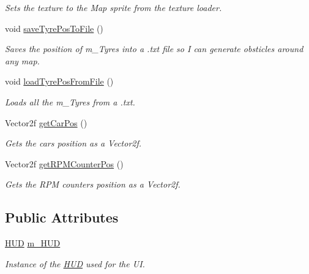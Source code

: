 \begin{DoxyCompactItemize}
\begin{DoxyCompactList}\small\item\em Sets the texture to the Map sprite from the texture loader. \end{DoxyCompactList}\item 
void \hyperlink{class_game_a907fa46ec6aa134985c1845d4cf20de2}{save\+Tyre\+Pos\+To\+File} ()
\begin{DoxyCompactList}\small\item\em Saves the position of m\+\_\+\+Tyres into a .txt file so I can generate obsticles around any map. \end{DoxyCompactList}\item 
void \hyperlink{class_game_a16d92220f4808914017486e36c7e44cb}{load\+Tyre\+Pos\+From\+File} ()
\begin{DoxyCompactList}\small\item\em Loads all the m\+\_\+\+Tyres from a .txt. \end{DoxyCompactList}\item 
Vector2f \hyperlink{class_game_a2e73dcb8b9d6a9fb89c00a5446fbc473}{get\+Car\+Pos} ()
\begin{DoxyCompactList}\small\item\em Gets the cars position as a Vector2f. \end{DoxyCompactList}\item 
Vector2f \hyperlink{class_game_a6c9677367a84a4201e45200a3fc08dcc}{get\+R\+P\+M\+Counter\+Pos} ()
\begin{DoxyCompactList}\small\item\em Gets the R\+P\+M counters position as a Vector2f. \end{DoxyCompactList}\end{DoxyCompactItemize}
\subsection*{Public Attributes}
\begin{DoxyCompactItemize}
\item 
\hypertarget{class_game_a7da845052dc5b3e38721d6a1564f0f82}{}\hyperlink{class_h_u_d}{H\+U\+D} \hyperlink{class_game_a7da845052dc5b3e38721d6a1564f0f82}{m\+\_\+\+H\+U\+D}\label{class_game_a7da845052dc5b3e38721d6a1564f0f82}

\begin{DoxyCompactList}\small\item\em Instance of the \hyperlink{class_h_u_d}{H\+U\+D} used for the U\+I. \end{DoxyCompactList}\end{DoxyCompactItemize}
